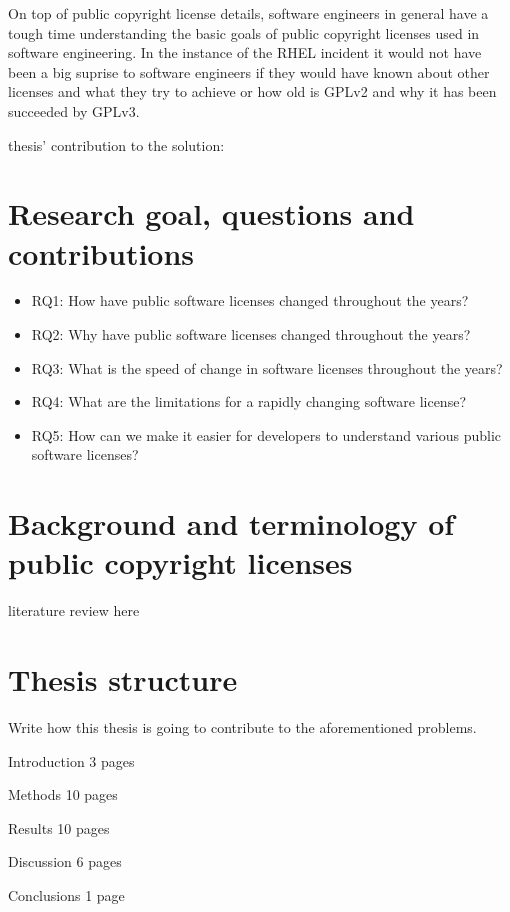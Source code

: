 On top of public copyright license details, software engineers in general have a tough time understanding the basic goals of public copyright licenses used in software engineering. In the instance of the RHEL incident it would not have been a big suprise to software engineers if they would have known about other licenses and what they try to achieve or how old is GPLv2 and why it has been succeeded by GPLv3.



thesis' contribution to the solution:

\section{Research goal, questions and contributions}

\begin{itemize}
	\item RQ1: How have public software licenses changed throughout the years?
	\item RQ2: Why have public software licenses changed throughout the years?
	\item RQ3: What is the speed of change in software licenses throughout the years?
	\item RQ4: What are the limitations for a rapidly changing software license?
	\item RQ5: How can we make it easier for developers to understand various public software licenses?
\end{itemize}

\section{Background and terminology of public copyright licenses}
literature review here

\section{Thesis structure}

Write how this thesis is going to contribute to the aforementioned problems.

Introduction 3 pages

Methods 10 pages

Results 10 pages

Discussion 6 pages

Conclusions 1 page
